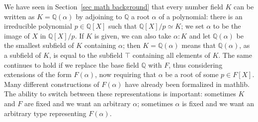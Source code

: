 \documentclass[a4paper,USenglish,cleveref, autoref, thm-restate]{lipics-v2021}
\newcommand{\lean}[1]{\texttt{#1}\xspace} %
\newcommand{\mathlib}{\textsf{mathlib}\xspace}
\newcommand{\Q}{\mathbb{Q}}
\begin{document}
We have seen in Section~\ref{sec math background} that every number field $K$ can be written as
$K=\Q(\alpha)$ by adjoining to $\Q$ a root $\alpha$ of a polynomial: there is an irreducible polynomial $p \in \Q[X]$ such that $\Q[X] / p \simeq K$; we set $\alpha$ to be the image of $X$ in $\Q[X] / p$.
If $K$ is given, we can also take $\alpha : K$ and let $\Q(\alpha)$ be the smallest subfield of $K$ containing $\alpha$; %
then $K = \Q(\alpha)$ means that $\Q(\alpha)$, as a subfield of $K$, is equal to the subfield $\top$ containing all elements of $K$. 
The same continues to hold if we replace the base field $\Q$ with $F$, thus considering extensions of the form $F(\alpha)$, now requiring that $\alpha$ be a root of some $p\in F[X]$. Many different constructions of $F(\alpha)$ have already been formalized in \mathlib. The ability to switch between these representations is important: sometimes $K$ and $F$ are fixed and we want an arbitrary $\alpha$; sometimes $\alpha$ is fixed and we want an arbitrary type representing $F(\alpha)$. 

\end{document}
